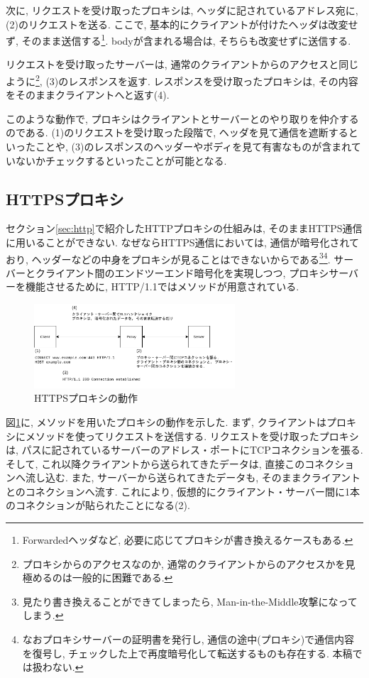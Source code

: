 \documentclass[10pt,a4paper,uplatex,a4j,dvipdfmx]{jsarticle}
\begin{document}
\begin{multicols}{2}
    次に, リクエストを受け取ったプロキシは, ヘッダに記されているアドレス宛に, (2)のリクエストを送る. ここで, 基本的にクライアントが付けたヘッダは改変せず, そのまま送信する\footnote{Forwardedヘッダ\cite{rfc:7239}など, 必要に応じてプロキシが書き換えるケースもある.}. bodyが含まれる場合は, そちらも改変せずに送信する.
    
    リクエストを受け取ったサーバーは, 通常のクライアントからのアクセスと同じように\footnote{プロキシからのアクセスなのか, 通常のクライアントからのアクセスかを見極めるのは一般的に困難である.}, (3)のレスポンスを返す. レスポンスを受け取ったプロキシは, その内容をそのままクライアントへと返す(4).
    
    このような動作で, プロキシはクライアントとサーバーとのやり取りを仲介するのである. (1)のリクエストを受け取った段階で, ヘッダを見て通信を遮断するといったことや, (3)のレスポンスのヘッダーやボディを見て有害なものが含まれていないかチェックするといったことが可能となる.

    \subsection{HTTPSプロキシ}
    セクション\ref{sec:http}で紹介したHTTPプロキシの仕組みは, そのままHTTPS通信に用いることができない. なぜならHTTPS通信においては, 通信が暗号化されており, ヘッダーなどの中身をプロキシが見ることはできないからである\footnote{見たり書き換えることができてしまったら, Man-in-the-Middle攻撃になってしまう.}\footnote{なおプロキシサーバーの証明書を発行し, 通信の途中(プロキシ)で通信内容を復号し, チェックした上で再度暗号化して転送するものも存在する. 本稿では扱わない.}.
    サーバーとクライアント間のエンドツーエンド暗号化を実現しつつ, プロキシサーバーを機能させるために, HTTP/1.1ではメソッドが用意されている\cite{rfc:7231}.

    \begin{figure}[H]
      \center
      \includegraphics[width=7.5cm]{img/proxyhttps.pdf}
      \caption{HTTPSプロキシの動作 \label{img:proxy:https}}
    \end{figure}
    
    図\ref{img:proxy:https}に, メソッドを用いたプロキシの動作を示した.
    まず, クライアントはプロキシにメソッドを使ってリクエストを送信する.
    リクエストを受け取ったプロキシは, パスに記されているサーバーのアドレス・ポートにTCPコネクションを張る. そして, これ以降クライアントから送られてきたデータは, 直接このコネクションへ流し込む. また, サーバーから送られてきたデータも, そのままクライアントとのコネクションへ流す.
    これにより, 仮想的にクライアント・サーバー間に1本のコネクションが貼られたことになる(2).
    

\end{multicols}
\end{document}
